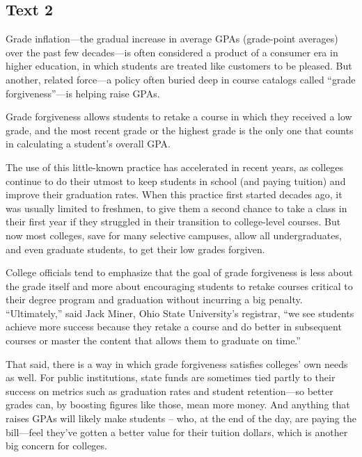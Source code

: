 \newpage


\subsection{Text 2}

Grade inflation---the gradual increase in average GPAs
(grade-point averages) over the past few decades---is often considered
a product of a consumer era in higher education, in which students are
treated like customers to be pleased. But another, related force---a
policy often buried deep in course catalogs called ``grade forgiveness''---is helping raise GPAs. 


Grade forgiveness allows students to
retake a course in which they received a low grade, and the most recent
grade or the highest grade is the only one that counts in calculating a
student's overall GPA. 



The use of this little-known practice has
accelerated in recent years, as colleges continue to do their utmost to
keep students in school (and paying tuition) and improve their
graduation rates. When this practice first started decades ago, it was
usually limited to freshmen, to give them a second chance to take a
class in their first year if they struggled in their transition to
college-level courses. But now most colleges, save for many selective
campuses, allow all undergraduates, and even graduate students, to get
their low grades forgiven. 


College officials tend to emphasize
that the goal of grade forgiveness is less about the grade itself and
more about encouraging students to retake courses critical to their
degree program and graduation without incurring a big penalty.
``Ultimately,'' said Jack Miner, Ohio State University's registrar, ``we
see students achieve more success because they retake a course and do
better in subsequent courses or master the content that allows them to
graduate on time.'' 



That said, there is a way in which grade
forgiveness satisfies colleges' own needs as well. For public
institutions, state funds are sometimes tied partly to their success on
metrics such as graduation rates and student retention---so better
grades can, by boosting figures like those, mean more money. And
anything that raises GPAs will likely make students -- who, at the end
of the day, are paying the bill---feel they've gotten a better value
for their tuition dollars, which is another big concern for colleges.



